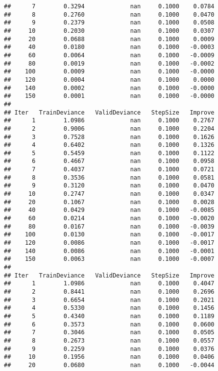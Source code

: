 \documentclass[
]{article}
\begin{document}
\begin{verbatim}
##      7        0.3294             nan     0.1000    0.0784
##      8        0.2760             nan     0.1000    0.0470
##      9        0.2379             nan     0.1000    0.0508
##     10        0.2030             nan     0.1000    0.0307
##     20        0.0688             nan     0.1000    0.0009
##     40        0.0180             nan     0.1000   -0.0003
##     60        0.0064             nan     0.1000   -0.0009
##     80        0.0019             nan     0.1000   -0.0002
##    100        0.0009             nan     0.1000   -0.0000
##    120        0.0004             nan     0.1000    0.0000
##    140        0.0002             nan     0.1000   -0.0000
##    150        0.0001             nan     0.1000   -0.0000
## 
## Iter   TrainDeviance   ValidDeviance   StepSize   Improve
##      1        1.0986             nan     0.1000    0.2767
##      2        0.9006             nan     0.1000    0.2204
##      3        0.7528             nan     0.1000    0.1626
##      4        0.6402             nan     0.1000    0.1326
##      5        0.5459             nan     0.1000    0.1122
##      6        0.4667             nan     0.1000    0.0958
##      7        0.4037             nan     0.1000    0.0721
##      8        0.3536             nan     0.1000    0.0581
##      9        0.3120             nan     0.1000    0.0470
##     10        0.2747             nan     0.1000    0.0347
##     20        0.1067             nan     0.1000    0.0028
##     40        0.0429             nan     0.1000   -0.0085
##     60        0.0214             nan     0.1000   -0.0020
##     80        0.0167             nan     0.1000   -0.0039
##    100        0.0130             nan     0.1000   -0.0017
##    120        0.0086             nan     0.1000   -0.0017
##    140        0.0086             nan     0.1000   -0.0001
##    150        0.0063             nan     0.1000   -0.0007
## 
## Iter   TrainDeviance   ValidDeviance   StepSize   Improve
##      1        1.0986             nan     0.1000    0.4047
##      2        0.8441             nan     0.1000    0.2696
##      3        0.6654             nan     0.1000    0.2021
##      4        0.5330             nan     0.1000    0.1456
##      5        0.4340             nan     0.1000    0.1189
##      6        0.3573             nan     0.1000    0.0600
##      7        0.3046             nan     0.1000    0.0505
##      8        0.2673             nan     0.1000    0.0557
##      9        0.2259             nan     0.1000    0.0376
##     10        0.1956             nan     0.1000    0.0406
##     20        0.0680             nan     0.1000   -0.0044

\end{verbatim}
\end{document}
